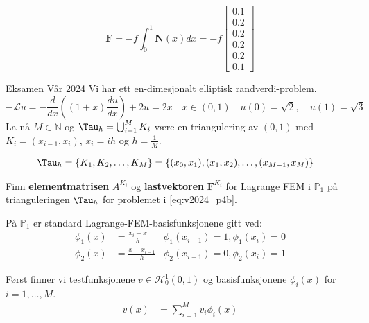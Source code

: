 \documentclass[../main.tex]{subfiles}
\begin{document}
\begin{equation*}
    \symbf{F} = - \bar{f} \int_0^1 \symbf{N}(x) dx = - \bar{f} \begin{bmatrix}
        0.1 \\ 0.2 \\ 0.2 \\ 0.2 \\ 0.2 \\ 0.1
    \end{bmatrix}
\end{equation*}


\begin{example}{Eksamen Vår 2024}{}
    Vi har ett en-dimesjonalt elliptisk randverdi-problem.
    \begin{equation*}
        -\mathcal{L}u  = -\frac{d}{dx} \left( (1 + x) \frac{du}{dx} \right) + 2u = 2x \quad x \in (0, 1) \quad
        u(0)           = \sqrt{2}, \quad u(1) = \sqrt{3}
        \label{eq:v2024_p4b}
    \end{equation*}
    La nå \(M \in \mathbb{N}\) og \(\Tau_h = \bigcup_{i=1}^M K_i\) være en triangulering av \((0, 1)\) med \(K_i = (x_{i-1}, x_i)\), \(x_i = ih\) og \(h = \frac{1}{M}\).

    \begin{align*}
        \Tau_h & = \{K_1, K_2, \ldots, K_M\}=\{(x_0, x_1), (x_1, x_2), \ldots, (x_{M-1}, x_M)\}
    \end{align*}

    Finn \textbf{elementmatrisen} $A^{K_i}$ og \textbf{lastvektoren} $\symbf{F}^{K_i}$ for Lagrange FEM i $\mathbb{P}_1$ på trianguleringen $\Tau_h$ for problemet i \eqref{eq:v2024_p4b}.

    På $\mathbb{P}_1$ er standard Lagrange-FEM-basisfunksjonene gitt ved:
    \begin{align*}
        \phi_1(x) & = \frac{x_i - x}{h}     & \phi_1(x_{i-1}) = 1, \phi_1(x_i) = 0 \\
        \phi_2(x) & = \frac{x - x_{i-1}}{h} & \phi_2(x_{i-1}) = 0, \phi_2(x_i) = 1
    \end{align*}

    Først finner vi testfunksjonene \(v \in \mathcal{H}_0^1(0, 1)\) og basisfunksjonene \(\phi_i(x)\) for \(i = 1, \ldots, M\).
    \begin{align*}
        v(x) & = \sum_{i=1}^M v_i \phi_i(x) \\
    \end{align*}
\end{example}
\end{document}
